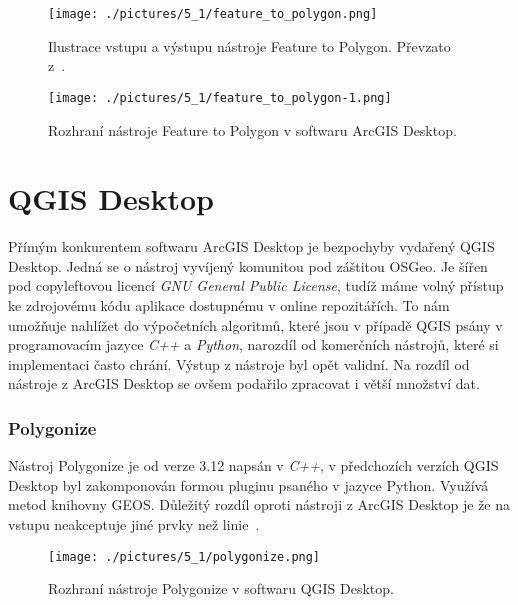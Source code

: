 \begin{figure}[h]
  \centering
  \texttt{[image: ./pictures/5\_1/feature\_to\_polygon.png]}
  \caption{Ilustrace vstupu a výstupu nástroje Feature to Polygon. Převzato z~\cite{arcgis}.}
  \label{fig:feature_to_polygon}
\end{figure}

\begin{figure}[h]
  \centering
  \texttt{[image: ./pictures/5\_1/feature\_to\_polygon-1.png]}
  \caption{Rozhraní nástroje Feature to Polygon v softwaru ArcGIS Desktop.}
  \label{fig:feature_to_polygon-1}
\end{figure}


\section{QGIS Desktop}
Přímým konkurentem softwaru ArcGIS Desktop je bezpochyby vydařený QGIS
Desktop. Jedná se o nástroj vyvíjený komunitou pod záštitou OSGeo. Je
šířen pod copyleftovou licencí \textit{GNU General Public License},
tudíž máme volný přístup ke zdrojovému kódu aplikace dostupnému v
online repozitářích. To nám umožňuje nahlížet do výpočetních
algoritmů, které jsou v případě QGIS psány v programovacím jazyce
\textit{C++} a \textit{Python}, narozdíl od komerčních nástrojů, které
si implementaci často chrání. Výstup z nástroje byl opět validní. Na
rozdíl od nástroje z ArcGIS Desktop se ovšem podařilo zpracovat i
větší množství dat.

\subsubsection{Polygonize}
Nástroj Polygonize je od verze 3.12 napsán v \textit{C++}, v
předchozích verzích QGIS Desktop byl zakomponován formou pluginu
psaného v jazyce Python. Využívá metod knihovny GEOS. Důležitý rozdíl
oproti nástroji z ArcGIS Desktop je že na vstupu neakceptuje jiné
prvky než linie~\cite{QGIS_software}.

\begin{figure}[h]
  \centering
  \texttt{[image: ./pictures/5\_1/polygonize.png]}
  \caption{Rozhraní nástroje Polygonize v softwaru QGIS Desktop.}
  \label{fig:polygonize}
\end{figure}

